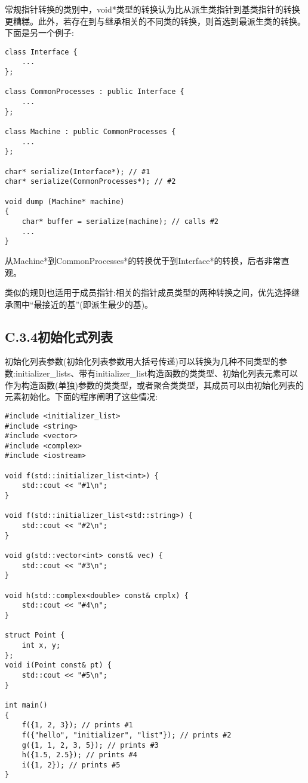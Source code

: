 常规指针转换的类别中，void*类型的转换认为比从派生类指针到基类指针的转换更糟糕。此外，若存在到与继承相关的不同类的转换，则首选到最派生类的转换。下面是另一个例子:

\begin{lstlisting}[style=styleCXX]
class Interface {
	...
};

class CommonProcesses : public Interface {
	...
};

class Machine : public CommonProcesses {
	...
};

char* serialize(Interface*); // #1
char* serialize(CommonProcesses*); // #2

void dump (Machine* machine)
{
	char* buffer = serialize(machine); // calls #2
	...
}
\end{lstlisting}

从Machine*到CommonProcesses*的转换优于到Interface*的转换，后者非常直观。

类似的规则也适用于成员指针:相关的指针成员类型的两种转换之间，优先选择继承图中“最接近的基”(即派生最少的基)。

\subsection{C.3.4\hspace{0.2cm}初始化式列表}

初始化列表参数(初始化列表参数用大括号传递)可以转换为几种不同类型的参数:initializer\_lists、带有initializer\_list构造函数的类类型、初始化列表元素可以作为构造函数(单独)参数的类类型，或者聚合类类型，其成员可以由初始化列表的元素初始化。下面的程序阐明了这些情况:

\begin{lstlisting}[style=styleCXX]
#include <initializer_list>
#include <string>
#include <vector>
#include <complex>
#include <iostream>

void f(std::initializer_list<int>) {
	std::cout << "#1\n";
}

void f(std::initializer_list<std::string>) {
	std::cout << "#2\n";
}

void g(std::vector<int> const& vec) {
	std::cout << "#3\n";
}

void h(std::complex<double> const& cmplx) {
	std::cout << "#4\n";
}

struct Point {
	int x, y;
};
void i(Point const& pt) {
	std::cout << "#5\n";
}

int main()
{
	f({1, 2, 3}); // prints #1
	f({"hello", "initializer", "list"}); // prints #2
	g({1, 1, 2, 3, 5}); // prints #3
	h({1.5, 2.5}); // prints #4
	i({1, 2}); // prints #5
}	
\end{lstlisting}

